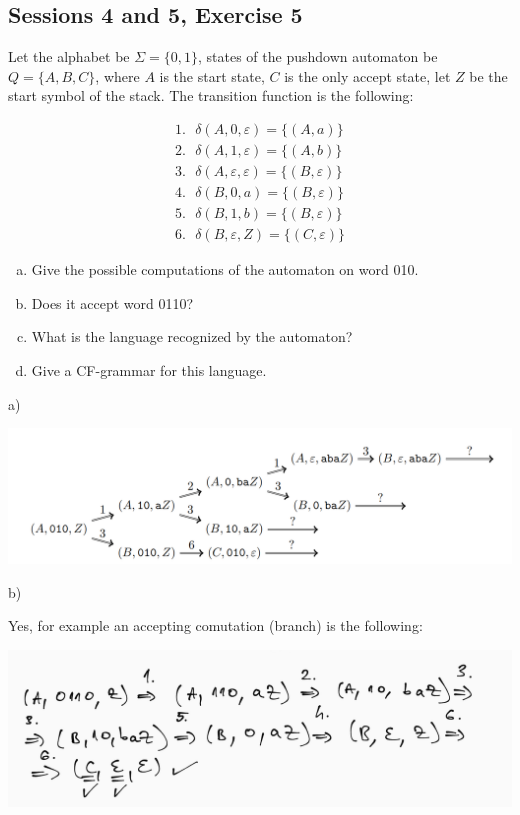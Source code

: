 \subsection{Sessions 4 and 5, Exercise 5}


Let the alphabet be $\Sigma=\{0,1\}$, states of the pushdown automaton be $Q=\{A,B,C\}$, where $A$ is the start state, $C$ is the only accept state, let $Z$ be the start symbol of the stack. The transition function is the following:

\begin{align*}
    1.\text{ }\delta(A,0,\varepsilon) = \{(A,a)\}\\
    2.\text{ }\delta(A,1,\varepsilon) = \{(A, b)\}\\
    3.\text{ }\delta(A,\varepsilon,\varepsilon) = \{(B,\varepsilon)\}\\
    4.\text{ }\delta(B,0,a) = \{(B,\varepsilon)\}\\
    5.\text{ }\delta(B,1,b) = \{(B,\varepsilon)\}\\
    6.\text{ }\delta(B,\varepsilon, Z) = \{(C,\varepsilon)\}
\end{align*}

\begin{enumerate}[a)]
    \item Give the possible computations of the automaton on word 010.
    \item Does it accept word 0110?
    \item What is the language recognized by the automaton?
    \item Give a CF-grammar for this language.
\end{enumerate}


a)

\includegraphics[width=\linewidth]{04/4_5_a.png}

b)

Yes, for example an accepting comutation (branch) is the following:


\includegraphics[width=\linewidth]{04/4_5_b.png}


